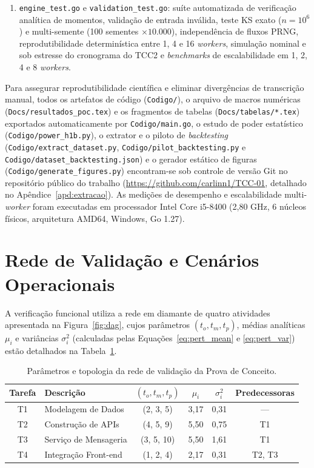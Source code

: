 \documentclass[12pt,openany,oneside,a4paper,english,brazilian,sumario=tradicional]{abntex2}
\newcommand{\fonteautores}{\par\vspace{1mm}{\small Fonte: Elaborado pelos autores (2026).}}
\begin{document}
\begin{enumerate}
  \item \texttt{engine\_test.go} e \texttt{validation\_test.go}: suíte automatizada de verificação analítica de momentos, validação de entrada inválida, teste KS exato ($n=10^6$) e multi-semente (100 sementes $\times 10.000$), independência de fluxos PRNG, reprodutibilidade determinística entre 1, 4 e 16 \textit{workers}, simulação nominal e sob estresse do cronograma do TCC2 e \textit{benchmarks} de escalabilidade em 1, 2, 4 e 8 \textit{workers}.
\end{enumerate}

Para assegurar reprodutibilidade científica e eliminar divergências de transcrição manual, todos os artefatos de código (\texttt{Codigo/}), o arquivo de macros numéricas (\texttt{Docs/}\allowbreak\texttt{resultados\_poc.tex}) e os fragmentos de tabelas (\texttt{Docs/}\allowbreak\texttt{tabelas/*.tex}) exportados automaticamente por \texttt{Codigo/main.go}, o estudo de poder estatístico (\texttt{Codigo/}\allowbreak\texttt{power\_h1b.py}), o extrator e o piloto de \textit{backtesting} (\texttt{Codigo/}\allowbreak\texttt{extract\_dataset.py}, \texttt{Codigo/}\allowbreak\texttt{pilot\_backtesting.py} e \texttt{Codigo/}\allowbreak\texttt{dataset\_backtesting.json}) e o gerador estático de figuras (\texttt{Codigo/}\allowbreak\texttt{generate\_figures.py}) encontram-se sob controle de versão Git no repositório público do trabalho (\url{https://github.com/carlinn1/TCC-01}, detalhado no Apêndice~\ref{apd:extracao}). As medições de desempenho e escalabilidade multi-\textit{worker} foram executadas em processador Intel Core i5-8400 (2,80 GHz, 6 núcleos físicos, arquitetura AMD64, Windows, Go 1.27).

\section{Rede de Validação e Cenários Operacionais}\label{sec:poc_cenarios}

A verificação funcional utiliza a rede em diamante de quatro atividades apresentada na Figura~\ref{fig:dag}, cujos parâmetros $(t_o, t_m, t_p)$, médias analíticas $\mu_i$ e variâncias $\sigma_i^2$ (calculadas pelas Equações~\ref{eq:pert_mean} e \ref{eq:pert_var}) estão detalhados na Tabela~\ref{tab:rede}.

\begin{table}[htbp]
\caption{Parâmetros e topologia da rede de validação da Prova de Conceito.}\label{tab:rede}
\footnotesize
\begin{tabularx}{\textwidth}{c X c c c c}
\toprule
\textbf{Tarefa} & \textbf{Descrição} & $(t_o,t_m,t_p)$ & $\mu_i$ & $\sigma_i^2$ & \textbf{Predecessoras}\\
\midrule
T1 & Modelagem de Dados & (2, 3, 5) & 3,17 & 0,31 & ---\\
T2 & Construção de APIs & (4, 5, 9) & 5,50 & 0,75 & T1\\
T3 & Serviço de Mensageria & (3, 5, 10) & 5,50 & 1,61 & T1\\
T4 & Integração Front-end & (1, 2, 4) & 2,17 & 0,31 & T2, T3\\
\bottomrule
\end{tabularx}
\fonteautores
\end{table}
\end{document}
